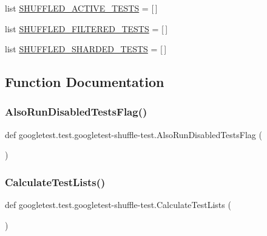 \begin{DoxyCompactItemize}
\item 
list \mbox{\hyperlink{namespacegoogletest_1_1test_1_1googletest-shuffle-test_ac78bd9a121af7f78d8e22be1a57e6002}{S\+H\+U\+F\+F\+L\+E\+D\+\_\+\+A\+C\+T\+I\+V\+E\+\_\+\+T\+E\+S\+TS}} = \mbox{[}$\,$\mbox{]}
\item 
list \mbox{\hyperlink{namespacegoogletest_1_1test_1_1googletest-shuffle-test_a98136657778035b6fb7087746cdc602a}{S\+H\+U\+F\+F\+L\+E\+D\+\_\+\+F\+I\+L\+T\+E\+R\+E\+D\+\_\+\+T\+E\+S\+TS}} = \mbox{[}$\,$\mbox{]}
\item 
list \mbox{\hyperlink{namespacegoogletest_1_1test_1_1googletest-shuffle-test_a85901517bb840ae8e27a50d878232ccd}{S\+H\+U\+F\+F\+L\+E\+D\+\_\+\+S\+H\+A\+R\+D\+E\+D\+\_\+\+T\+E\+S\+TS}} = \mbox{[}$\,$\mbox{]}
\end{DoxyCompactItemize}


\subsection{Function Documentation}
\mbox{\label{namespacegoogletest_1_1test_1_1googletest-shuffle-test_a73fb59e0874bd06e935f7dae5f3a143f}} 
\subsubsection{\texorpdfstring{AlsoRunDisabledTestsFlag()}{AlsoRunDisabledTestsFlag()}}
{\footnotesize\ttfamily def googletest.\+test.\+googletest-\/shuffle-\/test.\+Also\+Run\+Disabled\+Tests\+Flag (\begin{DoxyParamCaption}{ }\end{DoxyParamCaption})}

\mbox{\label{namespacegoogletest_1_1test_1_1googletest-shuffle-test_aec84d8690d7bdc6863c19e91a4595a4f}} 
\subsubsection{\texorpdfstring{CalculateTestLists()}{CalculateTestLists()}}
{\footnotesize\ttfamily def googletest.\+test.\+googletest-\/shuffle-\/test.\+Calculate\+Test\+Lists (\begin{DoxyParamCaption}{ }\end{DoxyParamCaption})}

